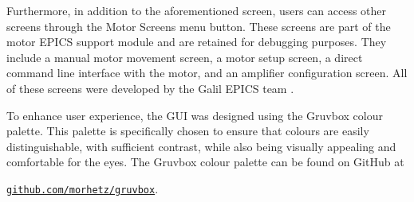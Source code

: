     Furthermore, in addition to the aforementioned screen, users can access other screens through the Motor Screens menu button.
    These screens are part of the motor EPICS support module and are retained for debugging purposes.
    They include a manual motor movement screen, a motor setup screen, a direct command line interface with the motor, and an amplifier configuration screen.
    All of these screens were developed by the Galil EPICS team \cite{farnswort2009}.

    To enhance user experience, the GUI was designed using the Gruvbox colour palette.
    This palette is specifically chosen to ensure that colours are easily distinguishable, with sufficient contrast, while also being visually appealing and comfortable for the eyes.
    The Gruvbox colour palette can be found on GitHub at

    \begin{center}
        \href{https://github.com/morhetz/gruvbox}{\texttt{github.com/morhetz/gruvbox}}.
    \end{center}
